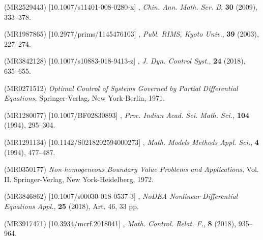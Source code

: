 \documentclass{dcds-bOF}
\theoremstyle{definition}
\begin{document}
\begin{thebibliography}{99}
 (MR2529443) [10.1007/s11401-008-0280-x]
\newblock {},
\newblock \emph{Chin. Ann. Math. Ser. B}, \textbf{30} (2009), 333--378.

 (MR1987865) [10.2977/prims/1145476103]
\newblock {},
\newblock \emph{Publ. RIMS, Kyoto Univ.}, \textbf{39} (2003), 227--274.

 (MR3842128) [10.1007/s10883-018-9413-z]
\newblock {},
\newblock \emph{J. Dyn. Control Syst.}, \textbf{24} (2018), 635--655.

 (MR0271512)
\newblock \emph{Optimal Control of Systems Governed by Partial Differential Equations,}
\newblock Springer-Verlag, New York-Berlin, 1971.

 (MR1280077) [10.1007/BF02830893]
\newblock {},
\newblock \emph{Proc. Indian Acad. Sci. Math. Sci.,} \textbf{104} (1994), 295--304.

 (MR1291134) [10.1142/S0218202594000273]
\newblock {},
\newblock \emph{Math. Models Methods Appl. Sci.}, \textbf{4} (1994), 477--487.

 (MR0350177)
\newblock \emph{Non-homogeneous Boundary Value Problems and Applications},
\newblock Vol. II. Springer-Verlag, New York-Heidelberg, 1972.

 (MR3846862) [10.1007/s00030-018-0537-3]
\newblock {},
\newblock \emph{NoDEA Nonlinear Differential Equations Appl.}, \textbf{25} (2018), Art. 46, 33 pp.

 (MR3917471) [10.3934/mcrf.2018041]
\newblock {},
\newblock \emph{Math. Control. Relat. F.}, \textbf{8} (2018), 935--964.


\end{thebibliography}
\end{document}
